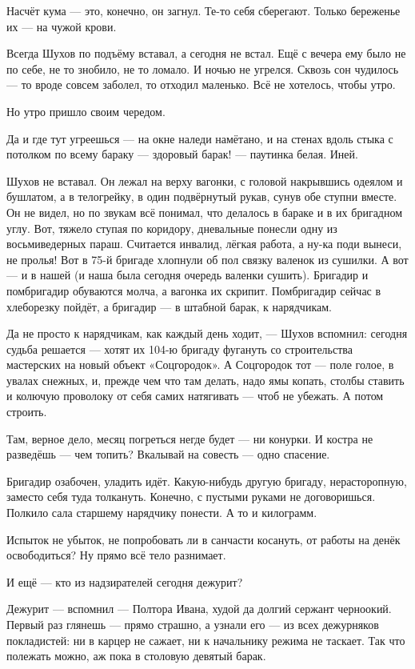 Насчёт кума --- это, конечно, он загнул. Те-то себя сберегают. Только береженье их --- на чужой
крови.

Всегда Шухов по подъёму вставал, а сегодня не встал. Ещё с вечера ему было не по себе, не то
знобило, не то ломало. И ночью не угрелся. Сквозь сон чудилось --- то вроде совсем заболел, то
отходил маленько. Всё не хотелось, чтобы утро.

Но утро пришло своим чередом.

Да и где тут угреешься --- на окне наледи намётано, и на стенах вдоль стыка с потолком по всему
бараку --- здоровый барак! --- паутинка белая. Иней.

Шухов не вставал. Он лежал на верху вагонки, с головой накрывшись одеялом и бушлатом, а в
телогрейку, в один подвёрнутый рукав, сунув обе ступни вместе. Он не видел, но по звукам всё
понимал, что делалось в бараке и в их бригадном углу. Вот, тяжело ступая по коридору,
дневальные понесли одну из восьмиведерных параш. Считается инвалид, лёгкая работа, а ну-ка
поди вынеси, не пролья! Вот в 75-й бригаде хлопнули об пол связку валенок из сушилки. А вот --- и
в нашей (и наша была сегодня очередь валенки сушить). Бригадир и помбригадир обуваются молча,
а вагонка их скрипит. Помбригадир сейчас в хлеборезку пойдёт, а бригадир --- в штабной барак, к
нарядчикам.

Да не просто к нарядчикам, как каждый день ходит, --- Шухов вспомнил: сегодня судьба решается
--- хотят их 104-ю бригаду фугануть со строительства мастерских на новый объект «Соцгородок». А
Соцгородок тот --- поле голое, в увалах снежных, и, прежде чем что там делать, надо ямы копать,
столбы ставить и колючую проволоку от себя самих натягивать --- чтоб не убежать. А потом
строить.

Там, верное дело, месяц погреться негде будет --- ни конурки. И костра не разведёшь --- чем
топить? Вкалывай на совесть --- одно спасение.

Бригадир озабочен, уладить идёт. Какую-нибудь другую бригаду, нерасторопную, заместо себя
туда толкануть. Конечно, с пустыми руками не договоришься. Полкило сала старшему нарядчику
понести. А то и килограмм.

Испыток не убыток, не попробовать ли в санчасти косануть, от работы на денёк освободиться? Ну
прямо всё тело разнимает.

И ещё --- кто из надзирателей сегодня дежурит?

Дежурит --- вспомнил --- Полтора Ивана, худой да долгий сержант черноокий. Первый раз глянешь ---
прямо страшно, а узнали его --- из всех дежурняков покладистей: ни в карцер не сажает, ни к
начальнику режима не таскает. Так что полежать можно, аж пока в столовую девятый барак.

